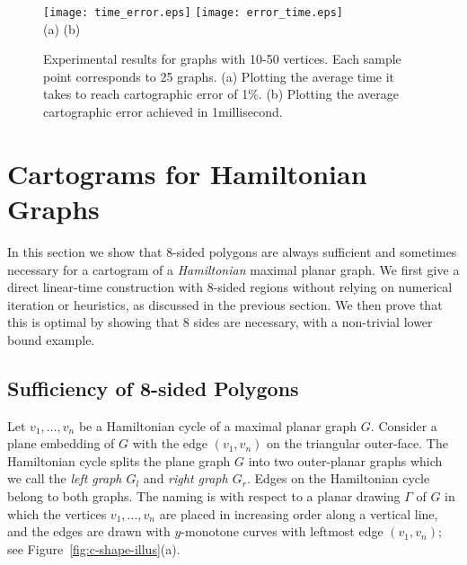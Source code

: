 \documentclass[11pt]{article}
\begin{document}
\begin{figure}[htbp]
\centering
\texttt{[image: time\_error.eps]}\hspace{.0cm}
\texttt{[image: error\_time.eps]}\\
 (a) \hspace{7cm} (b)\\
\caption{\small\sf Experimental results for graphs with 10-50 vertices. Each sample point corresponds to 25 graphs. (a) Plotting the average time it takes to reach cartographic error of 1\%. (b) Plotting the average cartographic error achieved in 1millisecond. }
\label{fig:exp}
\end{figure}











\section{Cartograms for Hamiltonian Graphs}
\label{sec:ham}

In this section we show that 8-sided polygons are always sufficient
and sometimes necessary for a cartogram of a {\em
 Hamiltonian} maximal planar graph.
 We first give a direct linear-time construction with 8-sided regions
 without relying on numerical iteration or heuristics, as discussed in the previous section.
 We then prove that this is optimal by showing that 8 sides are necessary, with a non-trivial lower bound example.

\subsection{Sufficiency of 8-sided Polygons}

Let $v_1,\dots,v_n$ be a Hamiltonian cycle of a maximal planar graph
  $G$. Consider a plane embedding of $G$ with the edge $(v_1,v_n)$ on the triangular outer-face. The Hamiltonian cycle splits the plane
 graph $G$ into two outer-planar graphs which we call the {\em left
   graph $G_l$} and {\em right graph $G_r$}. Edges on the Hamiltonian cycle belong to both graphs.
 The naming is with respect to a planar drawing $\Gamma$ of $G$ in which the
vertices
 $v_1,\dots,v_n$ are placed in increasing order along a vertical
 line, and the edges are drawn with $y$-monotone curves with leftmost
 edge $(v_1,v_n)$; see Figure~\ref{fig:c-shape-illus}(a).
\end{document}

